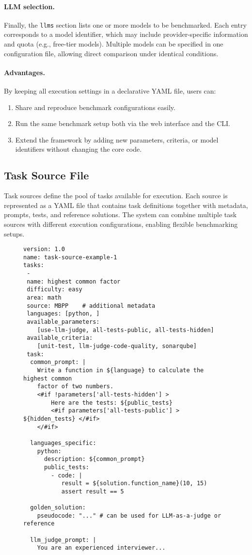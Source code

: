 \paragraph{LLM selection.}
Finally, the \texttt{llms} section lists one or more models to be benchmarked.
Each entry corresponds to a model identifier, which may include provider-specific information and quota (e.g., free-tier models).
Multiple models can be specified in one configuration file, allowing direct comparison under identical conditions.

\paragraph{Advantages.}
By keeping all execution settings in a declarative YAML file, users can:
\begin{enumerate}
    \item Share and reproduce benchmark configurations easily.
    \item Run the same benchmark setup both via the web interface and the CLI.
    \item Extend the framework by adding new parameters, criteria, or model identifiers without changing the core code.
\end{enumerate}


\subsection{Task Source File}

Task sources define the pool of tasks available for execution.
Each source is represented as a YAML file that contains task definitions together with metadata, prompts, tests, and reference solutions.
The system can combine multiple task sources with different execution configurations, enabling flexible benchmarking setups.

\begin{figure}[H]
\centering
\begin{verbatim}
version: 1.0
name: task-source-example-1
tasks:
 -
 name: highest common factor
 difficulty: easy
 area: math
 source: MBPP    # additional metadata
 languages: [python, ]
 available_parameters: 
    [use-llm-judge, all-tests-public, all-tests-hidden]
 available_criteria: 
    [unit-test, llm-judge-code-quality, sonarqube]
 task:
  common_prompt: |
    Write a function in ${language} to calculate the highest common 
    factor of two numbers.
    <#if !parameters['all-tests-hidden'] >
        Here are the tests: ${public_tests}
        <#if parameters['all-tests-public'] > ${hidden_tests} </#if>
    </#if>

  languages_specific:
    python:
      description: ${common_prompt}
      public_tests:
        - code: |
           result = ${solution.function_name}(10, 15)
           assert result == 5

  golden_solution:
    pseudocode: "..." # can be used for LLM-as-a-judge or reference

  llm_judge_prompt: |
    You are an experienced interviewer...
\end{verbatim}
\end{figure}

